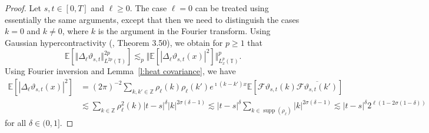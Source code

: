 \documentclass[11pt,a4paper]{article}
\newcommand{\mathd}{\mathrm{d}}
\newcommand{\tmop}[1]{\ensuremath{\operatorname{#1}}}
\theoremstyle{remark}
\newcommand{\R}{\mathbb{R}}
\newcommand{\Z}{\mathbb{Z}}
\newcommand{\E}{\mathbb{E}}
\newcommand{\CF}{\ensuremath{\mathscr{F}}}
\begin{document}
\begin{proof}
   Let $s, t \in [ 0, T ]$ and $\ell \geqslant 0$. The case $\ell = 0$ can be treated using essentially the same arguments, except that then we need to distinguish the cases $k= 0$ and $k\neq 0$, where $k$ is the argument in the Fourier transform. %
   Using Gaussian hypercontractivity (\cite{Janson1997}, Theorem 3.50), we obtain for $p \geqslant 1$ that
   \begin{equation}\label{e:burgers hypercontractivity}
      \E[\Vert  \Delta_{\ell} \vartheta_{s,t} \Vert_{L^{2 p} (\mathbb{T})}^{2 p}] \lesssim_p \Vert  \E [| \Delta_{\ell} \vartheta_{s,t}( x ) |^2] \Vert_{L^p_x ( \mathbb{T})}^p.
   \end{equation}
   Using Fourier inversion and Lemma~\ref{l:heat covariance}, we have
   \begin{align*}
      \E[| \Delta_{\ell} \vartheta_{s,t} (x)|^2] & = (2 \pi)^{-2} \sum_{k, k' \in \Z} \rho_{\ell} (k) \rho_{\ell}(k') e^{\imath (k - k') x } \E[\CF{\vartheta}_{s,t} ( k ) \overline{\CF{\vartheta}_{s,t} ( k')}] \\
      & \lesssim \sum_{k \in \Z} \rho^2_\ell(k) |t-s|^{\delta} |k|^{2\sigma(\delta - 1)} \lesssim |t-s|^{\delta} \sum_{k \in \tmop{supp} (\rho_{\ell})} |k|^{2\sigma(\delta - 1)} \lesssim |t-s|^{\delta} 2^{\ell(1 - 2 \sigma (1-\delta))}
   \end{align*}
   for all $\delta \in (0,1]$.
%   

\end{proof}
\end{document}
